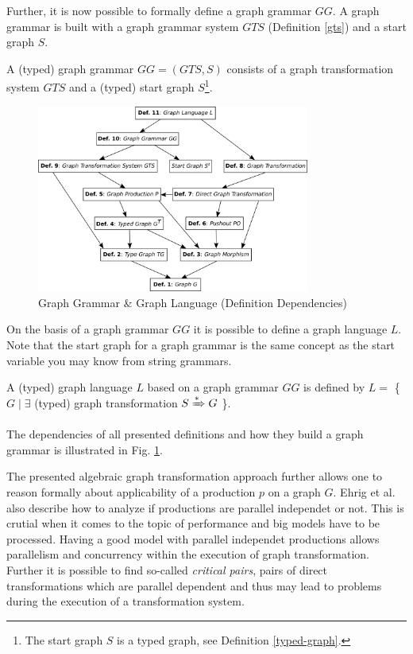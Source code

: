 \documentclass[runningheads]{llncs}
\begin{document}
\noindent
Further, it is now possible to formally define a graph grammar $GG$. A graph grammar is built with a graph grammar system $GTS$ (Definition \ref{gts}) and a start graph $S$. 

\begin{definition}
A (typed) graph grammar $GG = (GTS,S)$ consists of a graph transformation system $GTS$ and a (typed) start graph $S$\footnote{The start graph $S$ is a typed graph, see Definition \ref{typed-graph}.}.
\end{definition}

\begin{figure}[H]
	\centering
	\includegraphics[width=0.80\textwidth]{definitions-graph}
	\caption{Graph Grammar \& Graph Language (Definition Dependencies)}
	\label{fig:definitions-graph}
\end{figure}

\noindent
On the basis of a graph grammar $GG$ it is possible to define a graph language $L$. Note that the start graph for a graph grammar is the same concept as the start variable you may know from string grammars.

\begin{definition}
A (typed) graph language $L$ based on a graph grammar $GG$ is defined by $L = $ \{ $G \mid \exists$ (typed) graph transformation $S \xRightarrow{*} G$ \}.
\end{definition}

\noindent
The dependencies of all presented definitions and how they build a graph grammar is illustrated in Fig. \ref{fig:definitions-graph}.

The presented algebraic graph transformation approach further allows one to reason formally about applicability of a production $p$ on a graph $G$. Ehrig et al. \cite{DBLP:series/eatcs/EhrigEPT06} also describe how to analyze if productions are parallel independet or not. This is crutial when it comes to the topic of performance and big models have to be processed. Having a good model with parallel independet productions allows parallelism and concurrency within the execution of graph transformation. Further it is possible to find so-called \textit{critical pairs}, pairs of direct transformations which are parallel dependent and thus may lead to problems during the execution of a transformation system.
\end{document}
